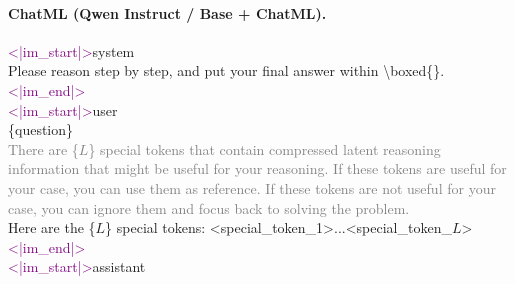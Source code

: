 \paragraph{ChatML (Qwen Instruct / Base + ChatML).}
\begin{tcolorbox}[colback=gray!5, colframe=black!60, arc=3pt, boxrule=0.5pt, fontupper=\footnotesize\ttfamily, breakable]
\textcolor{purple}{<|im\_start|>}system\\
Please reason step by step, and put your final answer within \textbackslash boxed\{\}.\textcolor{purple}{<|im\_end|>}\\
\textcolor{purple}{<|im\_start|>}user\\
\{question\}\\[0.3em]
\textcolor{gray}{There are \{$L$\} special tokens that contain compressed latent reasoning information that might be useful for your reasoning. If these tokens are useful for your case, you can use them as reference. If these tokens are not useful for your case, you can ignore them and focus back to solving the problem.}\\[0.3em]
Here are the \{$L$\} special tokens: \textcolor{blue!70!black}{<special\_token\_1>...<special\_token\_$L$>}\\
\textcolor{purple}{<|im\_end|>}\\
\textcolor{purple}{<|im\_start|>}assistant
\end{tcolorbox}

